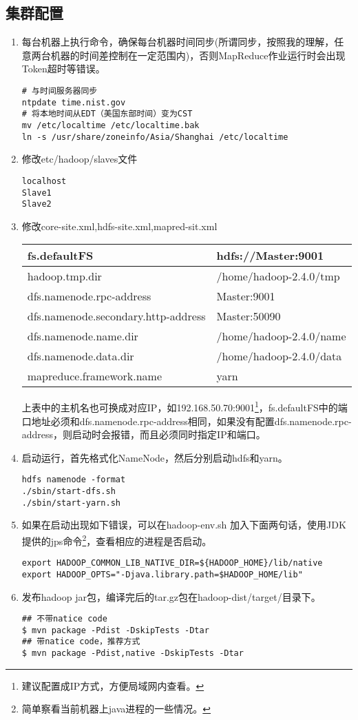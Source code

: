 \subsection{集群配置}
\begin{enumerate}[(1)]
\item 每台机器上执行命令，确保每台机器时间同步(所谓同步，按照我的理解，任意两台机器的时间差控制在一定范围内)，否则MapReduce作业运行时会出现Token超时等错误。
\begin{verbatim}
# 与时间服务器同步
ntpdate time.nist.gov
# 将本地时间从EDT（美国东部时间）变为CST
mv /etc/localtime /etc/localtime.bak
ln -s /usr/share/zoneinfo/Asia/Shanghai /etc/localtime
\end{verbatim}
\item 修改etc/hadoop/slaves文件
\begin{verbatim}
localhost
Slave1
Slave2
\end{verbatim}
\item 修改core-site.xml,hdfs-site.xml,mapred-sit.xml
\begin{table}[h]
  \centering
  \begin{tabular}{|l|l|}
\hline
fs.defaultFS &hdfs://Master:9001 \\ \hline
hadoop.tmp.dir & /home/hadoop-2.4.0/tmp \\ \hline
dfs.namenode.rpc-address & Master:9001\\ \hline
dfs.namenode.secondary.http-address& Master:50090 \\ \hline
dfs.namenode.name.dir   & /home/hadoop-2.4.0/name\\ \hline
dfs.namenode.data.dir   &   /home/hadoop-2.4.0/data\\ \hline
mapreduce.framework.name &  yarn \\ \hline
  \end{tabular}
\end{table}
\par 上表中的主机名也可换成对应IP，如192.168.50.70:9001\footnote{建议配置成IP方式，方便局域网内查看。}，fs.defaultFS中的端口地址必须和dfs.namenode.rpc-address相同，如果没有配置dfs.namenode.rpc-address，则启动时会报错，而且必须同时指定IP和端口。
\item 启动运行，首先格式化NameNode，然后分别启动hdfs和yarn。
\begin{verbatim}
hdfs namenode -format
./sbin/start-dfs.sh
./sbin/start-yarn.sh
\end{verbatim}
\item 如果在启动出现如下错误，可以在hadoop-env.sh 加入下面两句话，使用JDK提供的jps命令\footnote{简单察看当前机器上java进程的一些情况。}，查看相应的进程是否启动。
\begin{verbatim}
export HADOOP_COMMON_LIB_NATIVE_DIR=${HADOOP_HOME}/lib/native
export HADOOP_OPTS="-Djava.library.path=$HADOOP_HOME/lib"
\end{verbatim}
\item 发布hadoop jar包，编译完后的tar.gz包在hadoop-dist/target/目录下。
\begin{verbatim}
## 不带natice code
$ mvn package -Pdist -DskipTests -Dtar
## 带natice code，推荐方式
$ mvn package -Pdist,native -DskipTests -Dtar
\end{verbatim}
\end{enumerate}

